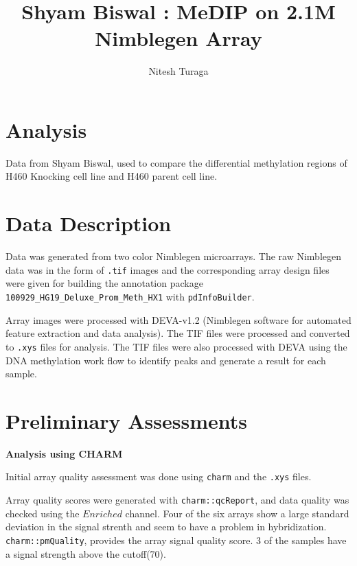 \documentclass[11pt]{article}
\begin{document}
\raggedright


\newcommand\NAME{Turaga}  %
\newcommand\ANDREWID{nturaga1@jhmi.edu}     %

\title{Shyam Biswal : MeDIP on 2.1M Nimblegen Array}
\author{Nitesh Turaga}
\maketitle
\section*{Analysis}

Data from Shyam Biswal, used to compare the differential methylation regions of H460 Knocking cell line and H460 parent cell line.

\section*{Data Description}

Data was generated from two color Nimblegen microarrays. The raw Nimblegen data was in the form of {\tt .tif} images and the corresponding array design files were given for building the annotation package {\tt 100929\_HG19\_Deluxe\_Prom\_Meth\_HX1}  with {\tt pdInfoBuilder}.

Array images were processed with DEVA-v1.2 (Nimblegen software for automated feature extraction and data analysis). The TIF files were processed and converted to {\tt .xys} files for analysis. The TIF files were also processed with DEVA using the DNA methylation work flow to identify peaks and generate a result for each sample.


\section*{Preliminary Assessments}

{\bf Analysis using CHARM}

Initial array quality assessment was done using {\tt charm} and the {\tt .xys} files. 

Array quality scores were generated with {\tt charm::qcReport}, and data quality was checked using the $Enriched$ channel. Four of the six arrays show a large standard deviation in the signal strenth and seem to have a problem in hybridization. {\tt charm::pmQuality}, provides the array signal quality score. 3 of the samples have a signal strength above the cutoff(70).
\end{document}
